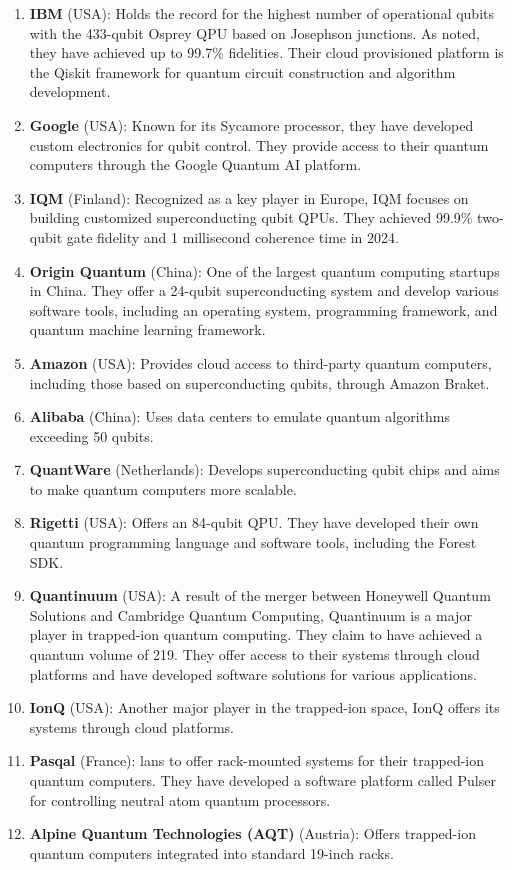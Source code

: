 \begin{enumerate}
\item \textbf{IBM} (USA): Holds the record for the highest number of operational qubits with the 433-qubit Osprey QPU
  \cite{IBM:ossprey:2024} based on Josephson junctions.
  As noted, they have achieved up to 99.7\% fidelities.
  Their cloud provisioned platform is the Qiskit \cite{Qiskit:2023} framework for quantum circuit construction and
  algorithm development.
\item \textbf{Google} (USA): Known for its Sycamore processor, they have developed custom electronics for qubit control.
  They provide access to their quantum computers through the Google Quantum AI platform.
\item \textbf{IQM} (Finland): Recognized as a key player in Europe, IQM focuses on building customized superconducting
  qubit QPUs.
  They achieved 99.9\% two-qubit gate fidelity and 1 millisecond coherence time in 2024.
\item \textbf{Origin Quantum} (China):  One of the largest quantum computing startups in China.
  They offer a 24-qubit superconducting system and develop various software tools, including an operating system,
  programming framework, and quantum machine learning framework.
\item \textbf{Amazon} (USA):  Provides cloud access to third-party quantum computers, including those based on
  superconducting qubits, through Amazon Braket.
\item \textbf{Alibaba} (China): Uses data centers to emulate quantum algorithms exceeding 50 qubits.
\item \textbf{QuantWare} (Netherlands):  Develops superconducting qubit chips and aims to make quantum computers more scalable.
\item \textbf{Rigetti} (USA): Offers an 84-qubit QPU.
 They have developed their own quantum programming language and software tools, including the Forest SDK.
\item \textbf{Quantinuum} (USA): A result of the merger between Honeywell Quantum Solutions and Cambridge Quantum Computing,
  Quantinuum is a major player in trapped-ion quantum computing.
 They claim to have achieved a quantum volume of 219.
 They offer access to their systems through cloud platforms and have developed software solutions for various applications.
\item \textbf{IonQ} (USA): Another major player in the trapped-ion space, IonQ offers its systems through cloud platforms.
\item \textbf{Pasqal} (France): lans to offer rack-mounted systems for their trapped-ion quantum computers.
 They have developed a software platform called Pulser for controlling neutral atom quantum processors.
\item \textbf{Alpine Quantum Technologies (AQT)} (Austria): Offers trapped-ion quantum computers integrated into
  standard 19-inch racks.
\end{enumerate}

